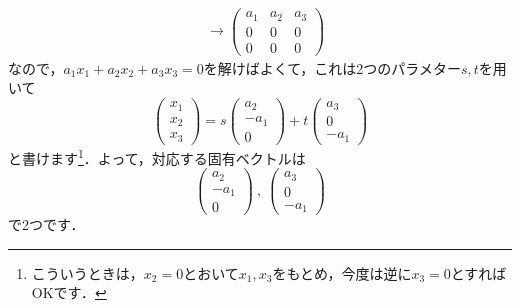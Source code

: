 \documentclass[a4paper,pdflatex,ja=standard]{bxjsarticle}
\begin{document}
\begin{itemize}
\begin{align}
    \nonumber
    \\
    &\rightarrow
    \begin{pmatrix}
      a_{1} & a_{2} & a_{3} \\
      0 & 0 & 0 \\
      0 & 0 & 0 
    \end{pmatrix}
  \end{align}
  なので，$a_{1}x_{1}+a_{2}x_{2}+a_{3}x_{3}=0$を解けばよくて，これは2つのパラメター$s,t$を用いて
  \begin{equation}
    \begin{pmatrix}
      x_{1} \\
      x_{2} \\
      x_{3}
    \end{pmatrix}
    =
    s
    \begin{pmatrix}
      a_{2} \\
      -a_{1} \\
      0
    \end{pmatrix}
    +
    t
    \begin{pmatrix}
      a_{3} \\
      0 \\
      -a_{1}
    \end{pmatrix}
  \end{equation}
  と書けます\footnote{
    こういうときは，$x_{2}=0$とおいて$x_{1},x_{3}$をもとめ，今度は逆に$x_{3}=0$とすればOKです．
  }．よって，対応する固有ベクトルは
  \begin{equation}
    \begin{pmatrix}
      a_{2} \\
      -a_{1} \\
      0
    \end{pmatrix}
    \ ,\ 
    \begin{pmatrix}
      a_{3} \\
      0 \\
      -a_{1}
    \end{pmatrix}
  \end{equation}
  で2つです．

\end{itemize}
\end{document}
